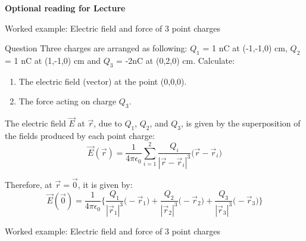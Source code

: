 %
%

\begin{frame}[plain,c]
\begin{center}
{\Huge \bf Optional reading for Lecture \thislecture}
\end{center}
\end{frame}


%
%

{
\problemslide

\begin{frame}{Worked example: Electric field and force of 3 point charges}

\begin{blockexmplque}{Question}
  Three charges are arranged as following:
  $Q_1$ = 1 nC at (-1,-1,0) cm, $Q_2$ = 1 nC at (1,-1,0) cm and $Q_3$ = -2nC at (0,2,0) cm.
  Calculate:
  \begin{enumerate}
    \item The electric field (vector) at the point (0,0,0).
    \item The force acting on charge $Q_3$.
  \end{enumerate}
\end{blockexmplque}

\vspace{0.2cm}

The electric field $\vec{E}$ at $\vec{r}$, due to $Q_1$, $Q_2$, and $Q_3$,
is given by the superposition of the fields produced by each point charge:
\begin{equation*}
  \vec{E}(\vec{r}) = \frac{1}{4\pi \epsilon_0}
       \sum_{i=1}^{2} \frac{Q_i}{|\vec{r}-\vec{r}_i|^3} \Big( \vec{r}-\vec{r}_i \Big)
\end{equation*}

Therefore, at $\vec{r}=\vec{0}$, it is given by:
\begin{equation*}
  \vec{E}(\vec{0}) = \frac{1}{4\pi \epsilon_0} \Big\{
          \frac{Q_1}{|\vec{r}_1|^3} \Big( - \vec{r}_1 \Big) +
          \frac{Q_2}{|\vec{r}_2|^3} \Big( - \vec{r}_2 \Big) +
          \frac{Q_3}{|\vec{r}_3|^3} \Big( - \vec{r}_3 \Big)
      \Big\}
\end{equation*}

\end{frame}

%
%
%

\begin{frame}{Worked example: Electric field and force of 3 point charges}


\end{frame}}
